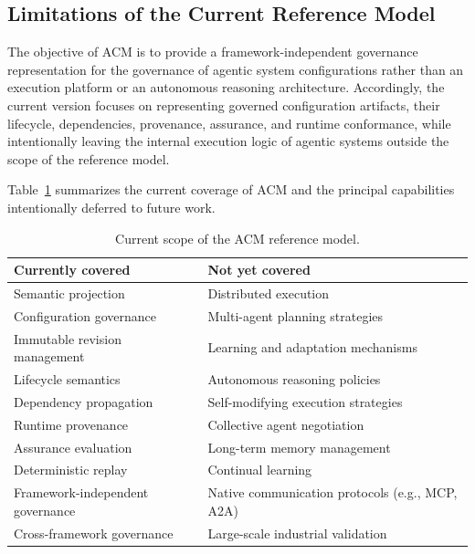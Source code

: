 \documentclass[10pt]{article}
\begin{document}
\subsection{Limitations of the Current Reference Model}
\label{subsec:limitations}

The objective of ACM is to provide a framework-independent governance representation for the governance of agentic system configurations rather than an execution platform or an autonomous reasoning architecture. Accordingly, the current version focuses on representing governed configuration artifacts, their lifecycle, dependencies, provenance, assurance, and runtime conformance, while intentionally leaving the internal execution logic of agentic systems outside the scope of the reference model.

Table~\ref{tab:limitations_scope} summarizes the current coverage of ACM and the principal capabilities intentionally deferred to future work.

\begin{table}[t]
	\caption{Current scope of the ACM reference model.}
	\label{tab:limitations_scope}
	\centering
	\begin{tabular}{ll}
		
		\toprule
		
		Currently covered &
		Not yet covered \\
		
		\midrule
		
		Semantic projection &
		Distributed execution \\
		
		Configuration governance &
		Multi-agent planning strategies \\
		
		Immutable revision management &
		Learning and adaptation mechanisms \\
		
		Lifecycle semantics &
		Autonomous reasoning policies \\
		
		Dependency propagation &
		Self-modifying execution strategies \\
		
		Runtime provenance &
		Collective agent negotiation \\
		
		Assurance evaluation &
		Long-term memory management \\
		
		Deterministic replay &
		Continual learning \\
		
		Framework-independent governance &
		Native communication protocols (e.g., MCP, A2A) \\
		
		Cross-framework governance &
		Large-scale industrial validation \\
		
		\bottomrule
		
	\end{tabular}
	
	\end{table}
\end{document}
